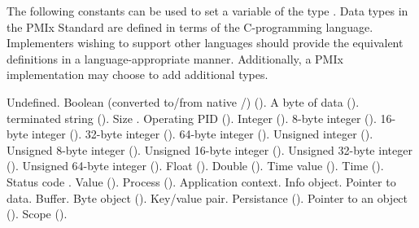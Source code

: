 \adviceimplstart
The following constants can be used to set a variable of the type . Data types in the \ac{PMIx} Standard are defined in terms of the C-programming language. Implementers wishing to support other languages should provide the equivalent definitions in a language-appropriate manner. Additionally, a PMIx implementation may choose to add additional types.
\adviceimplend

\begin{constantdesc}
%
Undefined.
%
Boolean (converted to/from native /) ().
%
A byte of data ().
%
 terminated string ().
%
Size .
%
Operating \ac{PID} ().
%
Integer ().
%
8-byte integer ().
%
16-byte integer ().
%
32-byte integer ().
%
64-byte integer ().
%
Unsigned integer ().
%
Unsigned 8-byte integer ().
%
Unsigned 16-byte integer ().
%
Unsigned 32-byte integer ().
%
Unsigned 64-byte integer ().
%
Float ().
%
Double ().
%
Time value ().
%
Time ().
%
Status code {}.
%
Value ().
%
Process ().
%
Application context.
%
Info object.
%
Pointer to data.
%
Buffer.
%
Byte object ().
%
Key/value pair.
%
Persistance ().
%
Pointer to an object ().
%
Scope ().
%

\end{constantdesc}
